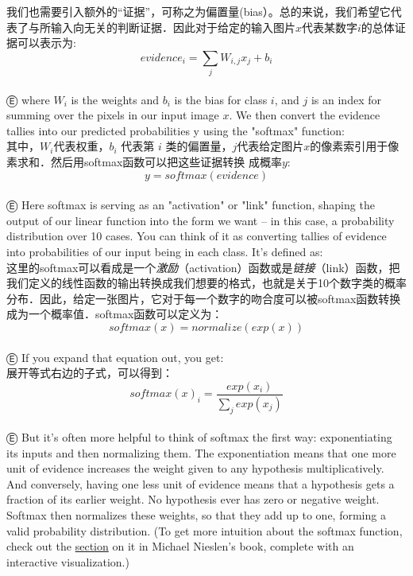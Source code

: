 我们也需要引入额外的“证据”，可称之为偏置量(bias）。总的来说，我们希望它代表了与所输入向无关的判断证据．因此对于给定的输入图片$x$代表某数字$i$的总体证据可以表示为:
\begin{equation}
evidence_i = \sum_j{W_{i,j}}x_j+b_i
\end{equation}\\
Ⓔ where $W_i$ is the weights and $b_i$ is the bias for class $i$, and $j$ is an index for summing over the pixels in our input image $x$. We then convert the evidence tallies into our predicted probabilities y using the "softmax" function:\\
其中，$W_i$代表权重，$b_i$ 代表第 $i$ 类的偏置量，$j$代表给定图片$x$的像素索引用于像素求和．然后用softmax函数可以把这些证据转换
成概率$y$:\\
\begin{equation}
y = softmax(evidence)
\end{equation}\\
Ⓔ Here softmax is serving as an "activation" or "link" function, shaping the output of our linear function into the form we want -- in this case, a probability distribution over 10 cases. You can think of it as converting tallies of evidence into probabilities of our input being in each class. It's defined as:\\
这里的softmax可以看成是一个\emph{激励}（activation）函数或是\emph{链接}（link）函数，把我们定义的线性函数的输出转换成我们想要的格式，也就是关于10个数字类的概率分布．因此，给定一张图片，它对于每一个数字的吻合度可以被softmax函数转换成为一个概率值．softmax函数可以定义为：\\
\begin{equation}
softmax(x) = normalize(exp(x))
\end{equation}\\
Ⓔ If you expand that equation out, you get:\\
展开等式右边的子式，可以得到：\\
\begin{equation}
softmax(x)_i = \frac{exp(x_i)}{\sum_j{exp(x_j)}}
\end{equation}\\
Ⓔ But it's often more helpful to think of softmax the first way: exponentiating its inputs and then normalizing them. The exponentiation means that one more unit of evidence increases the weight given to any hypothesis multiplicatively. And conversely, having one less unit of evidence means that a hypothesis gets a fraction of its earlier weight. No hypothesis ever has zero or negative weight. Softmax then normalizes these weights, so that they add up to one, forming a valid probability distribution. (To get more intuition about the softmax function, check out the \href{http://neuralnetworksanddeeplearning.com/chap3.html#softmax}{section} on it in Michael Nieslen's book, complete with an interactive visualization.)\\
